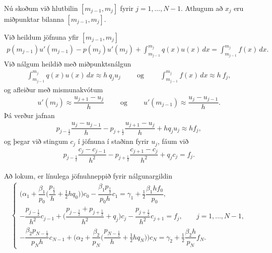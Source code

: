 \documentclass[a4paper,10pt,icelandic]{sphinxmanual}
\begin{document}
Nú skoðum við hlutbilin  \([m_{j−1}, m_j ]\) fyrir \(j=1, \dots, N-1\).
Athugum að \(x_j\) eru miðpunktar bilanna \([m_{j−1}, m_j ]\).

Við heildum jöfnuna yfir \([m_{j−1}, m_j ]\)
\begin{equation*}
\begin{split}p(m_{j-1})u'(m_{j-1})-p(m_j)u'(m_j)+\int_{m_{j-1}}^{m_j}q(x)u(x)\, dx
=\int_{m_{j-1}}^{m_j}f(x)\, dx.\end{split}
\end{equation*}
Við nálgum heildið með miðpunktsnálgun
\begin{equation*}
\begin{split}\int_{m_{j-1}}^{m_j}q(x)u(x)\, dx \approx h\ q_ju_j
\qquad \text{ og } \qquad
\int_{m_{j-1}}^{m_j}f(x)\, dx \approx h\ f_j,\end{split}
\end{equation*}
og afleiður með mismunakvótum
\begin{equation*}
\begin{split}u'(m_j)\approx \dfrac{u_{j+1}-u_j}h \qquad \text{ og } \qquad
u'(m_{j-1})\approx \dfrac{u_j-u_{j-1}}h.\end{split}
\end{equation*}
Þá verður jafnan
\begin{equation*}
\begin{split}p_{j-\frac 12}\dfrac{u_j-u_{j-1}}h
-p_{j+\frac 12}\dfrac{u_{j+1}-u_j}h
+h q_ju_j\approx hf_j,\end{split}
\end{equation*}
og þegar við stingum \(c_j\) í jöfnuna í staðinn fyrir \(u_j\), fáum við
\begin{equation*}
\begin{split}p_{j-\frac 12}\dfrac{c_{j}-c_{j-1}}{h^2}
-p_{j+\frac 12}\dfrac{c_{j+1}-c_j}{h^2}
+q_jc_j= f_j.\end{split}
\end{equation*}

Að lokum, er línulega jöfnuhneppið fyrir nálgunargildin
\begin{equation*}
\begin{split}\begin{cases}
\bigg(\alpha_1+\dfrac{\beta_1}{p_0}
\bigg(\dfrac{p_{\frac 12}}h+\tfrac 12 hq_0\bigg)\bigg)c_0
-\dfrac{\beta_1p_{\frac 12}}{p_0h}c_1
=\gamma_1+\tfrac 12 \dfrac{\beta_1hf_0}{p_0},
\\
-\dfrac{p_{j-\frac 12}}{h^2} c_{j-1}
+\bigg(\dfrac{p_{j-\frac 12}+p_{j+\frac 12}}{h^2}+q_j\bigg) c_j
-\dfrac{p_{j+\frac 12}}{h^2} c_{j+1}  =f_j, \qquad j=1, \dots, N-1,
\\
-\dfrac{\beta_2p_{N-\frac 12}}{p_Nh}c_{N-1}+
\bigg(\alpha_2+\dfrac{\beta_2}{p_N}\bigg(\dfrac{p_{N-\frac 12}}{h}+\tfrac
12 h q_N\bigg)\bigg)c_N
=\gamma_2+\tfrac 12\dfrac{\beta_2h}{p_N}f_N.
\end{cases}\end{split}
\end{equation*}
\end{document}
